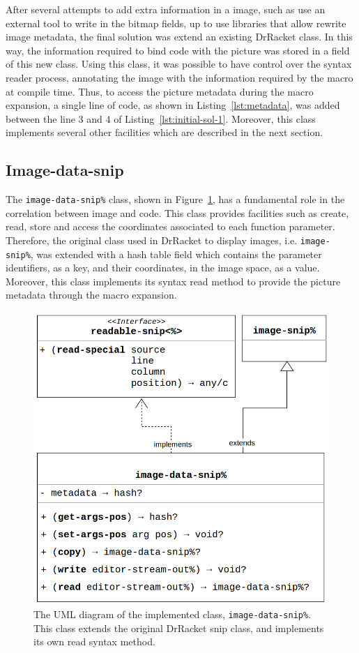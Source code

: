 After several attempts to add extra information in a image, such as use an external tool to write in the bitmap fields, up to use libraries that allow rewrite image metadata, the final solution was extend an existing DrRacket class. In this way, the information required to bind code with the picture was stored in a field of this new class. Using this class, it was possible to have control over the syntax reader process, annotating the image with the information required by the macro at compile time. Thus, to access the picture metadata during the macro expansion, a single line of code, as shown in Listing~\ref{lst:metadata}, was added between the line 3 and 4 of Listing~\ref{lst:initial-sol-1}. Moreover, this class implements several other facilities which are described in the next section.

\subsection{Image-data-snip}

The \texttt{image-data-snip\%} class, shown in Figure~\ref{fig:img-data-snip}, has a fundamental role in the correlation between image and code. This class provides facilities such as create, read, store and access the coordinates associated to each function parameter. Therefore, the original class used in DrRacket to display images, i.e. \texttt{image-snip\%}, was extended with a hash table field which contains the parameter identifiers, as a key, and their coordinates, in the image space, as a value. Moreover, this class implements its syntax read method to provide the picture metadata through the macro expansion.

\begin{figure}[!h]
    \centering
    \includegraphics[scale=0.25]{images/img-data-snip}
    \caption{The UML diagram of the implemented class, \texttt{image-data-snip\%}. This class extends the original DrRacket snip class, and implements its own read syntax method.}
    \label{fig:img-data-snip}
\end{figure}

